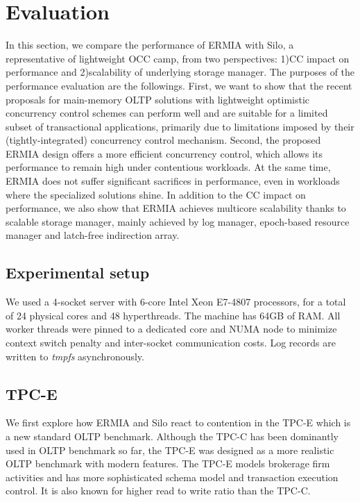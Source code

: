 
\section{Evaluation}
In this section, we compare the performance of ERMIA with Silo, a representative of lightweight OCC camp, from two perspectives: 1)CC impact on performance and 2)scalability of underlying storage manager. 
The purposes of the performance evaluation are the followings. First, we want to show that the recent proposals for main-memory OLTP solutions with lightweight optimistic concurrency control schemes can perform well and are suitable for a limited subset of transactional applications, primarily due to limitations imposed by their (tightly-integrated) concurrency control mechanism. Second, the proposed ERMIA design offers a more efficient concurrency control, which allows its performance to remain high under contentious workloads. At the same time, ERMIA does not suffer significant sacrifices in performance, even in workloads where the specialized solutions shine. In addition to the CC impact on performance, we also show that ERMIA achieves multicore scalability thanks to scalable storage manager, mainly achieved by log manager, epoch-based resource manager and latch-free indirection array. 


\subsection{Experimental setup}
We used a 4-socket server with 6-core Intel Xeon E7-4807 processors, for a total of 24 physical cores and 48 hyperthreads. The machine has 64GB of RAM. All worker threads were pinned to a dedicated core and NUMA node to minimize context switch penalty and inter-socket communication costs. Log records are written to \textit{tmpfs} asynchronously.

\subsection{TPC-E}
We first explore how ERMIA and Silo react to contention in the TPC-E which is a new standard OLTP benchmark. Although the TPC-C has been dominantly used in OLTP benchmark so far, the TPC-E was designed as a more realistic OLTP benchmark with modern features. The TPC-E models brokerage firm activities and has more sophisticated schema model and transaction execution control. It is also known for higher read to write ratio than the TPC-C. 

